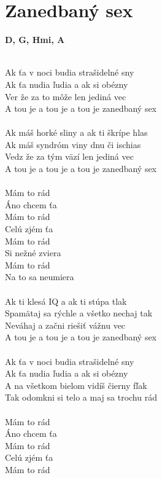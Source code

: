 \section{Zanedbaný sex}
\footnotesize\textbf{D, G, Hmi, A}\\
\normalsize
\\
\begin{multicols}{2}
Ak ťa v noci budia strašidelné sny\\
Ak ťa nudia ľudia a ak si obézny\\
Ver že za to môže len jediná vec\\
A tou je a tou je a tou je zanedbaný sex\\
\\
Ak máš horké sliny a ak ti škrípe hlas\\
Ak máš syndróm viny dnu či ischias\\
Vedz že za tým väzí len jediná vec\\
A tou je a tou je a tou je zanedbaný sex\\
\\
Mám to rád\\
Áno chcem ťa\\
Mám to rád\\
Celú zjém ťa\\
Mám to rád\\
Si nežné zviera\\
Mám to rád\\
Na to sa neumiera\\
\\
Ak ti klesá IQ a ak ti stúpa tlak\\
Spamätaj sa rýchle a všetko nechaj tak\\
Neváhaj a začni riešiť vážnu vec\\
A tou je a tou je a tou je zanedbaný sex\\
\\
Ak ťa v noci budia strašidelné sny\\
Ak ťa nudia ľudia a ak si obézny\\
A na všetkom bielom vidíš čierny fľak\\
Tak odomkni si telo a maj sa trochu rád\\
\\
Mám to rád\\
Áno chcem ťa\\
Mám to rád\\
Celú zjém ťa\\
Mám to rád\\

\end{multicols}
